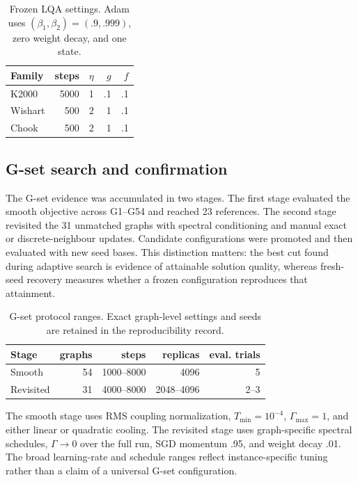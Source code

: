 \documentclass[
  aps,
  prx,
  reprint,
  amsmath,
  amssymb,
  groupedaddress,
  nofootinbib,
  floatfix,
  longbibliography
]{revtex4-2}
\newcommand{\lqa}{\textsc{LQA}}
\begin{document}
\begin{table}[t]
\caption{Frozen \lqa{} settings.  Adam uses
$(\beta_1,\beta_2)=(.9,.999)$, zero weight decay, and one state.}
\label{tab:lqa-settings}
\centering
\small
\setlength{\tabcolsep}{4pt}
\begin{tabular}{lrrrr}
\toprule
Family & steps & $\eta$ & $g$ & $f$ \\
\midrule
K2000 & 5000 & 1 & .1 & .1 \\
Wishart & 500 & 2 & 1 & .1 \\
Chook & 500 & 2 & 1 & .1 \\
\bottomrule
\end{tabular}
\end{table}

\subsection{G-set search and confirmation}

The G-set evidence was accumulated in two stages.  The first stage evaluated
the smooth objective across G1--G54 and reached 23 references.  The second
stage revisited the 31 unmatched graphs with spectral conditioning and manual
exact or discrete-neighbour updates.  Candidate configurations were promoted
and then evaluated with new seed bases.  This distinction matters: the best
cut found during adaptive search is evidence of attainable solution quality,
whereas fresh-seed recovery measures whether a frozen configuration reproduces
that attainment.

\begin{table}[t]
\caption{G-set protocol ranges.  Exact graph-level settings and seeds are
retained in the reproducibility record.}
\label{tab:gset-protocol}
\centering
\small
\setlength{\tabcolsep}{4pt}
\begin{tabular}{lrrrr}
\toprule
Stage & graphs & steps & replicas & eval. trials \\
\midrule
Smooth & 54 & 1000--8000 & 4096 & 5 \\
Revisited & 31 & 4000--8000 & 2048--4096 & 2--3 \\
\bottomrule
\end{tabular}
\end{table}

The smooth stage uses RMS coupling normalization, $T_{\min}=10^{-4}$,
$\Gamma_{\max}=1$, and either linear or quadratic cooling.  The revisited
stage uses graph-specific spectral schedules, $\Gamma\to0$ over the full run,
SGD momentum .95, and weight decay .01.  The broad learning-rate and schedule
ranges reflect instance-specific tuning rather than a claim of a universal
G-set configuration.
\end{document}
